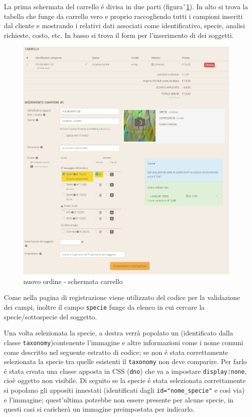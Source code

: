 La prima schermata del carrello é divisa in due parti (figura˜\ref{fig:pno-cart}). In alto si trova la tabella che funge da carrello vero e proprio raccogliendo tutti i campioni inseriti dal cliente e mostrando i relativi dati associati come identificativo, specie, analisi richieste, costo, etc. In basso si trova il form per l'inserimento di dei soggetti.

\begin{figure}
 \includegraphics[width=1\textwidth]{images/pno-cart} 
 \caption{nuovo ordine - schermata carrello}
 \label{fig:pno-cart}
\end{figure}

Come nella pagina di registrazione viene utilizzato del codice {\js} per la validazione dei campi, inoltre il campo \texttt{specie} funge da elenco in cui cercare la specie/sottospecie del soggetto. 

Una volta selezionata la specie, a destra verrà popolato un  (identificato dalla classe \texttt{taxonomy})contenente l'immagine e altre informazioni come i nome comuni come descritto nel seguente estratto di codice; se non é stata correttamente selezionata la specie tra quelle esistenti  il  \texttt{taxonomy} non deve comparire. Per farlo é stata creata una classe apposta in CSS (\texttt{dno}) che va a impostare \texttt{display:none}, cioè oggetto non visibile. Di seguito se la specie é stata selezionata correttamente si popolano gli appositi  innestati (identificati dagli \texttt{id="nome\_specie"} e così via) e l'immagine; quest'ultima potrebbe non essere presente per alcune specie, in questi casi si caricherà un immagine preimpostata per indicarlo.

